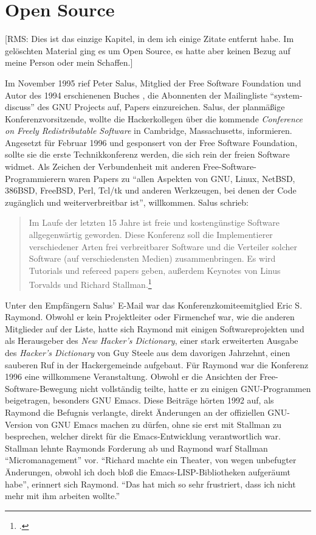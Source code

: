 \chapter{Open Source}
\label{open_source}

[RMS: Dies ist das einzige Kapitel, in dem ich einige Zitate entfernt habe. Im gelöschten Material ging es um Open Source, es hatte aber keinen Bezug auf meine Person oder mein Schaffen.]

Im November 1995 rief Peter Salus, Mitglied der Free Software Foundation und Autor des 1994 erschienenen Buches , die Abonnenten der Mailingliste "`system-discuss"' des GNU Projects auf, Papers einzureichen. Salus, der planmäßige Konferenzvorsitzende, wollte die Hackerkollegen über die kommende \textit{Conference on Freely Redistributable Software} in Cambridge, Massachusetts, informieren. Angesetzt für Februar 1996 und gesponsert von der Free Software Foundation, sollte sie die erste Technikkonferenz werden, die sich rein der freien Software widmet. Als Zeichen der Verbundenheit mit anderen Free-Software-Programmierern waren Papers zu "`allen Aspekten von GNU, Linux, NetBSD, 386BSD, FreeBSD, Perl, Tcl/tk und anderen Werkzeugen, bei denen der Code zugänglich und weiterverbreitbar ist"', willkommen. Salus schrieb: 
\begin{quote}
Im Laufe der letzten 15 Jahre ist freie und kostengünstige Software allgegenwärtig geworden. Diese Konferenz soll die Implementierer verschiedener Arten frei verbreitbarer Software und die Verteiler solcher Software (auf verschiedensten Medien) zusammenbringen. Es wird Tutorials und refereed papers geben, außerdem Keynotes von Linus Torvalds und Richard Stallman.\footcite[][]{callfpap}
\end{quote}

Unter den Empfängern Salus' E-Mail war das Konferenzkomiteemitglied Eric S. Raymond. Obwohl er kein Projektleiter oder Firmenchef war, wie die anderen Mitglieder auf der Liste, hatte sich Raymond mit einigen Softwareprojekten und als Herausgeber des \textit{New Hacker's Dictionary}, einer stark erweiterten Ausgabe des \textit{Hacker's Dictionary} von Guy Steele aus dem davorigen Jahrzehnt, einen sauberen Ruf in der Hackergemeinde aufgebaut. Für Raymond war die Konferenz 1996 eine willkommene Veranstaltung. Obwohl er die Ansichten der Free-Software-Bewegung nicht vollständig teilte, hatte er zu einigen GNU-Programmen beigetragen, besonders GNU Emacs. Diese Beiträge hörten 1992 auf, als Raymond die Befugnis verlangte, direkt Änderungen an der offiziellen GNU-Version von GNU Emacs machen zu dürfen, ohne sie erst mit Stallman zu besprechen, welcher direkt für die Emacs-Entwicklung verantwortlich war. Stallman lehnte Raymonds Forderung ab und Raymond warf Stallman "`Micromanagement"' vor. "`Richard machte ein Theater, von wegen unbefugter Änderungen, obwohl ich doch bloß die Emacs-LISP-Bibliotheken aufgeräumt habe"', erinnert sich Raymond. "`Das hat mich so sehr frustriert, dass ich nicht mehr mit ihm arbeiten wollte."'

